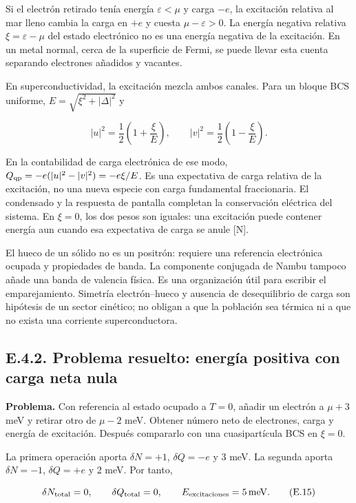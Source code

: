 \documentclass[
  spanish,
  10pt,
  a4paper,
]{article}
\begin{document}
Si el electrón retirado tenía energía \(\varepsilon<\mu\) y carga
\(-e\), la excitación relativa al mar lleno cambia la carga en \(+e\) y
cuesta \(\mu-\varepsilon>0\). La energía negativa relativa
\(\xi=\varepsilon-\mu\) del estado electrónico no es una energía
negativa de la excitación. En un metal normal, cerca de la superficie de
Fermi, se puede llevar esta cuenta separando electrones añadidos y
vacantes.

En superconductividad, la excitación mezcla ambos canales. Para un
bloque BCS uniforme, \(E=\sqrt{\xi^2+|\Delta|^2}\) y

\[
|u|^2=\frac12\left(1+\frac{\xi}{E}\right),\qquad
|v|^2=\frac12\left(1-\frac{\xi}{E}\right).
\tag{E.14}
\]

En la contabilidad de carga electrónica de ese modo,
\(Q_{\rm qp}=-e(|u|^2-|v|^2)=-e\xi/E\). Es una expectativa de carga
relativa de la excitación, no una nueva especie con carga fundamental
fraccionaria. El condensado y la respuesta de pantalla completan la
conservación eléctrica del sistema. En \(\xi=0\), los dos pesos son
iguales: una excitación puede contener energía aun cuando esa
expectativa de carga se anule {[}N{]}.

El hueco de un sólido no es un positrón: requiere una referencia
electrónica ocupada y propiedades de banda. La componente conjugada de
Nambu tampoco añade una banda de valencia física. Es una organización
útil para escribir el emparejamiento. Simetría electrón--hueco y
ausencia de desequilibrio de carga son hipótesis de un sector cinético;
no obligan a que la población sea térmica ni a que no exista una
corriente superconductora.

\subsection{E.4.2. Problema resuelto: energía positiva con carga neta
nula}\label{e.4.2.-problema-resuelto-energuxeda-positiva-con-carga-neta-nula}

\textbf{Problema.} Con referencia al estado ocupado a \(T=0\), añadir un
electrón a \(\mu+3\) meV y retirar otro de \(\mu-2\) meV. Obtener número
neto de electrones, carga y energía de excitación. Después compararlo
con una cuasipartícula BCS en \(\xi=0\).

La primera operación aporta \(\delta N=+1\), \(\delta Q=-e\) y 3 meV. La
segunda aporta \(\delta N=-1\), \(\delta Q=+e\) y 2 meV. Por tanto,

\[
\delta N_{\rm total}=0,\qquad \delta Q_{\rm total}=0,
\qquad E_{\rm excitaciones}=5\,\mathrm{meV}.
\tag{E.15}
\]
\end{document}
